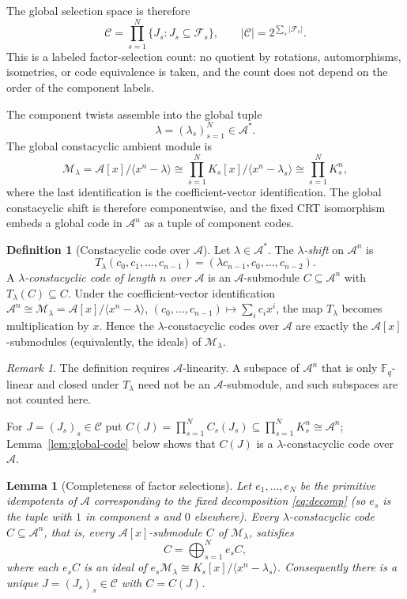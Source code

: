 \documentclass[10pt,a4paper]{article}
\newcommand{\F}{\mathbb F}
\newcommand{\A}{\mathcal A}
\newcommand{\Fs}{\mathcal F_s}
\numberwithin{equation}{section}
\theoremstyle{plain}
\newtheorem{lemma}[theorem]{Lemma}
\theoremstyle{definition}
\newtheorem{definition}[theorem]{Definition}
\theoremstyle{remark}
\newtheorem{remark}[theorem]{Remark}
\begin{document}
The global selection space is therefore
\[
\mathscr C=\prod_{s=1}^{N}\{J_s:J_s\subseteq\Fs\},
\qquad
|\mathscr C|=2^{\sum_s|\Fs|} .
\]
This is a labeled factor-selection count: no quotient by rotations,
automorphisms, isometries, or code equivalence is taken, and the count does not
depend on the order of the component labels.

The component twists assemble into the global tuple
\[
\lambda=(\lambda_s)_{s=1}^{N}\in\A^* .
\]
The global constacyclic ambient module is
\begin{equation}\label{eq:ambient}
\mathcal M_\lambda
 =\A[x]/\langle x^n-\lambda\rangle
 \cong\prod_{s=1}^{N}K_s[x]/\langle x^n-\lambda_s\rangle
 \cong\prod_{s=1}^{N}K_s^n,
\end{equation}
where the last identification is the coefficient-vector identification. The
global constacyclic shift is therefore componentwise, and the fixed CRT
isomorphism embeds a global code in $\A^n$ as a tuple of component codes.

\begin{definition}[Constacyclic code over $\A$]\label{def:constacyclic-A}
Let $\lambda\in\A^{*}$. The \emph{$\lambda$-shift} on $\A^{n}$ is
\[
T_\lambda(c_0,c_1,\dots,c_{n-1})=(\lambda c_{n-1},c_0,\dots,c_{n-2}).
\]
A \emph{$\lambda$-constacyclic code of length $n$ over $\A$} is an
$\A$-submodule $C\subseteq\A^{n}$ with $T_\lambda(C)\subseteq C$. Under the
coefficient-vector identification $\A^{n}\cong\mathcal M_\lambda=\A[x]/\langle x^{n}-\lambda\rangle$,
$(c_0,\dots,c_{n-1})\mapsto\sum_i c_ix^{i}$, the map $T_\lambda$ becomes
multiplication by $x$. Hence the $\lambda$-constacyclic codes over $\A$ are
exactly the $\A[x]$-submodules (equivalently, the ideals) of
$\mathcal M_\lambda$.
\end{definition}

\begin{remark}\label{rem:A-linear}
The definition requires $\A$-linearity. A subspace of $\A^{n}$ that is only
$\F_q$-linear and closed under $T_\lambda$ need not be an $\A$-submodule, and
such subspaces are not counted here.
\end{remark}

For $J=(J_s)_s\in\mathscr C$ put
$C(J)=\prod_{s=1}^{N}C_s(J_s)\subseteq\prod_{s=1}^{N}K_s^n\cong\A^n$;
Lemma~\ref{lem:global-code} below shows that $C(J)$ is a $\lambda$-constacyclic
code over $\A$.

\begin{lemma}[Completeness of factor selections]\label{lem:complete}
Let $e_1,\dots,e_N$ be the primitive idempotents of $\A$ corresponding to the
fixed decomposition \eqref{eq:decomp} (so $e_s$ is the tuple with $1$ in
component $s$ and $0$ elsewhere). Every $\lambda$-constacyclic code
$C\subseteq\A^{n}$, that is, every $\A[x]$-submodule $C$ of
$\mathcal M_\lambda$, satisfies
\[
C=\bigoplus_{s=1}^{N} e_sC,
\]
where each $e_sC$ is an ideal of
$e_s\mathcal M_\lambda\cong K_s[x]/\langle x^{n}-\lambda_s\rangle$.
Consequently there is a unique $J=(J_s)_s\in\mathscr C$ with $C=C(J)$.
\end{lemma}
\end{document}
